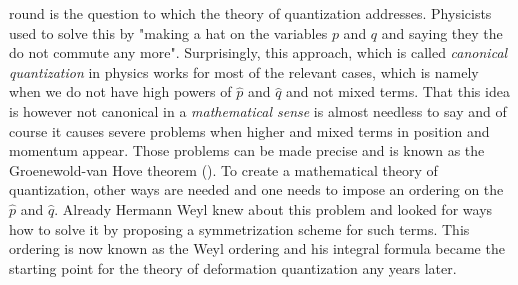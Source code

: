 round is the question to which the theory of quantization addresses. Physicists 
used to solve this by "making a hat on the variables $p$ and $q$ and saying they 
the do not commute any more". Surprisingly, this approach, which is called 
\emph{canonical quantization} in physics works for most of the relevant cases, 
which is namely when we do not have high powers of $\hat p$ and $\hat q$ and not 
mixed terms. That this idea is however not canonical in a \emph{mathematical 
sense} is almost needless to say and of course it causes severe problems when 
higher and mixed terms in position and momentum appear. Those problems can be 
made precise and is known as the Groenewold-van Hove theorem 
(\cite{vanhove:1951a, groenewold:1946a}). To create a mathematical theory of 
quantization, other ways are needed and one needs to impose an ordering on the 
$\hat p$ and $\hat q$. Already Hermann Weyl knew about this problem and looked 
for ways how to solve it by proposing a symmetrization \cite{weyl:1931a} scheme 
for such terms. This ordering is now known as the Weyl ordering and his integral 
formula became the starting point for the theory of deformation quantization any 
years later.


